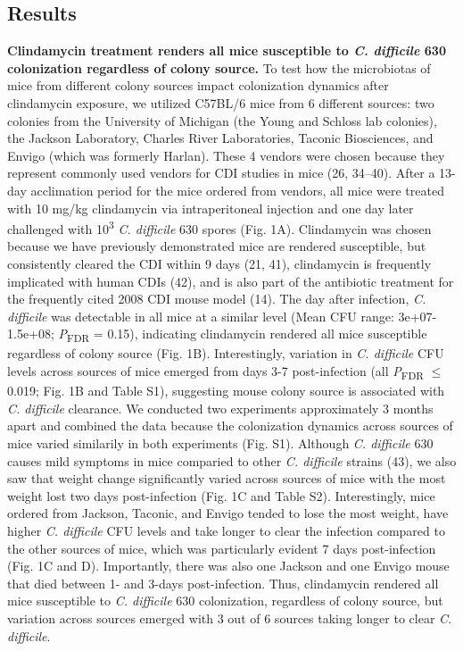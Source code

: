 \documentclass[11pt,]{article}
\begin{document}
\subsection{Results}\label{results}

\textbf{Clindamycin treatment renders all mice susceptible to \emph{C.
difficile} 630 colonization regardless of colony source.} To test how
the microbiotas of mice from different colony sources impact
colonization dynamics after clindamycin exposure, we utilized C57BL/6
mice from 6 different sources: two colonies from the University of
Michigan (the Young and Schloss lab colonies), the Jackson Laboratory,
Charles River Laboratories, Taconic Biosciences, and Envigo (which was
formerly Harlan). These 4 vendors were chosen because they represent
commonly used vendors for CDI studies in mice (26, 34--40). After a
13-day acclimation period for the mice ordered from vendors, all mice
were treated with 10 mg/kg clindamycin via intraperitoneal injection and
one day later challenged with 10\textsuperscript{3} \emph{C. difficile}
630 spores (Fig. 1A). Clindamycin was chosen because we have previously
demonstrated mice are rendered susceptible, but consistently cleared the
CDI within 9 days (21, 41), clindamycin is frequently implicated with
human CDIs (42), and is also part of the antibiotic treatment for the
frequently cited 2008 CDI mouse model (14). The day after infection,
\emph{C. difficile} was detectable in all mice at a similar level (Mean
CFU range: 3e+07-1.5e+08; \emph{P}\textsubscript{FDR} = 0.15),
indicating clindamycin rendered all mice susceptible regardless of
colony source (Fig. 1B). Interestingly, variation in \emph{C. difficile}
CFU levels across sources of mice emerged from days 3-7 post-infection
(all \emph{P}\textsubscript{FDR} \(\le\) 0.019; Fig. 1B and Table S1),
suggesting mouse colony source is associated with \emph{C. difficile}
clearance. We conducted two experiments approximately 3 months apart and
combined the data because the colonization dynamics across sources of
mice varied similarily in both experiments (Fig. S1). Although \emph{C.
difficile} 630 causes mild symptoms in mice comparied to other \emph{C.
difficile} strains (43), we also saw that weight change significantly
varied across sources of mice with the most weight lost two days
post-infection (Fig. 1C and Table S2). Interestingly, mice ordered from
Jackson, Taconic, and Envigo tended to lose the most weight, have higher
\emph{C. difficile} CFU levels and take longer to clear the infection
compared to the other sources of mice, which was particularly evident 7
days post-infection (Fig. 1C and D). Importantly, there was also one
Jackson and one Envigo mouse that died between 1- and 3-days
post-infection. Thus, clindamycin rendered all mice susceptible to
\emph{C. difficile} 630 colonization, regardless of colony source, but
variation across sources emerged with 3 out of 6 sources taking longer
to clear \emph{C. difficile}.
\end{document}
